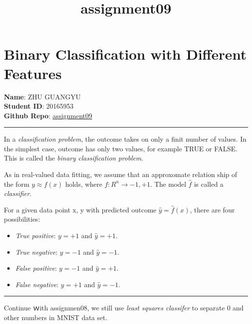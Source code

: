 \documentclass[11pt]{article}
\title{assignment09}
\providecommand{\tightlist}{%
      \setlength{\itemsep}{0pt}\setlength{\parskip}{0pt}}
\begin{document}
    
    
    \maketitle
    
    

    
    \section{Binary Classification with Different
Features}\label{binary-classification-with-different-features}

\textbf{Name}: ZHU GUANGYU\\
\textbf{Student ID}: 20165953\\
\textbf{Github Repo}:
\href{https://github.com/z1ggy-o/cv_assignment/tree/master/assignment09}{assignment09}

\begin{center}\rule{0.5\linewidth}{\linethickness}\end{center}

In a \emph{classification problem}, the outcome takes on only a finit
number of values. In the simplest case, outcome has only two values, for
example TRUE or FALSE. This is called the \emph{binary classification
problem}.

As in real-valued data fitting, we assume that an approxomate relation
ship of the form \(y \approx f(x)\) holds, where
\(f: R^{n} \rightarrow {-1, +1}\). The model \(\hat{f}\) is called a
\emph{classifier}.

For a given data point x, y with predicted outcome
\(\hat{y} = \hat{f}(x)\), there are four possibilities:

\begin{itemize}
\tightlist
\item
  \emph{True positive}: \(y = +1\) and \(\hat{y} = +1\).
\item
  \emph{True negative}: \(y = -1\) and \(\hat{y} = -1\).
\item
  \emph{False positive}: \(y = -1\) and \(\hat{y} = +1\).
\item
  \emph{False negative}: \(y = +1\) and \(\hat{y} = -1\).
\end{itemize}

\begin{center}\rule{0.5\linewidth}{\linethickness}\end{center}

Continue ｗith assignmen08, we still use \emph{least squares classifer}
to separate 0 and other numbers in MNIST data set.
\end{document}
